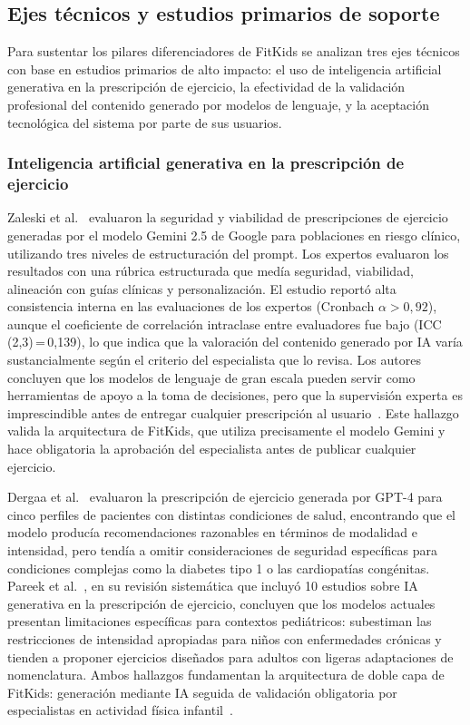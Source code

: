 		\subsection{Ejes técnicos y estudios primarios de soporte}
			Para sustentar los pilares diferenciadores de FitKids se analizan tres ejes técnicos con base en estudios primarios de alto impacto: el uso de inteligencia artificial generativa en la prescripción de ejercicio, la efectividad de la validación profesional del contenido generado por modelos de lenguaje, y la aceptación tecnológica del sistema por parte de sus usuarios.
			
			\subsubsection{Inteligencia artificial generativa en la prescripción de ejercicio}
				Zaleski et al.~\cite{Zaleski2026} evaluaron la seguridad y viabilidad de prescripciones de ejercicio generadas por el modelo Gemini 2.5 de Google para poblaciones en riesgo clínico, utilizando tres niveles de estructuración del prompt. Los expertos evaluaron los resultados con una rúbrica estructurada que medía seguridad, viabilidad, alineación con guías clínicas y personalización. El estudio reportó alta consistencia interna en las evaluaciones de los expertos (Cronbach $\alpha > 0{,}92$), aunque el coeficiente de correlación intraclase entre evaluadores fue bajo (ICC\,(2,3)\,=\,0,139), lo que indica que la valoración del contenido generado por IA varía sustancialmente según el criterio del especialista que lo revisa. Los autores concluyen que los modelos de lenguaje de gran escala pueden servir como herramientas de apoyo a la toma de decisiones, pero que la supervisión experta es imprescindible antes de entregar cualquier prescripción al usuario~\cite{Zaleski2026}. Este hallazgo valida la arquitectura de FitKids, que utiliza precisamente el modelo Gemini y hace obligatoria la aprobación del especialista antes de publicar cualquier ejercicio.
				
				Dergaa et al.~\cite{Dergaa2024} evaluaron la prescripción de ejercicio generada por GPT-4 para cinco perfiles de pacientes con distintas condiciones de salud, encontrando que el modelo producía recomendaciones razonables en términos de modalidad e intensidad, pero tendía a omitir consideraciones de seguridad específicas para condiciones complejas como la diabetes tipo 1 o las cardiopatías congénitas. Pareek et al.~\cite{Pareek2025}, en su revisión sistemática que incluyó 10 estudios sobre IA generativa en la prescripción de ejercicio, concluyen que los modelos actuales presentan limitaciones específicas para contextos pediátricos: subestiman las restricciones de intensidad apropiadas para niños con enfermedades crónicas y tienden a proponer ejercicios diseñados para adultos con ligeras adaptaciones de nomenclatura. Ambos hallazgos fundamentan la arquitectura de doble capa de FitKids: generación mediante IA seguida de validación obligatoria por especialistas en actividad física infantil~\cite{Dergaa2024,Pareek2025}.
			

